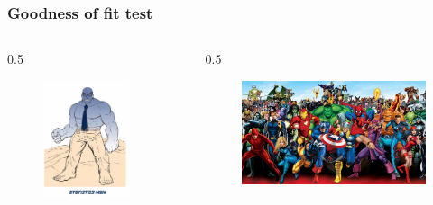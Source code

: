 \documentclass{beamer}
\begin{document}
\begin{frame}
  \frametitle{Goodness of fit test}

  \begin{columns}
    \begin{column} {0.5\textwidth}

    \begin{figure}
      \centering
        \includegraphics[width=0.8\textwidth]{img/les6-man.jpg}
    \end{figure}

    \end{column}
    \begin{column} {0.5\textwidth}

    \begin{figure}
      \centering
        \includegraphics[width=1.00\textwidth]{img/les5-heroes.jpg}
    \end{figure}

    \end{column}
  \end{columns}
\end{frame}
\end{document}
